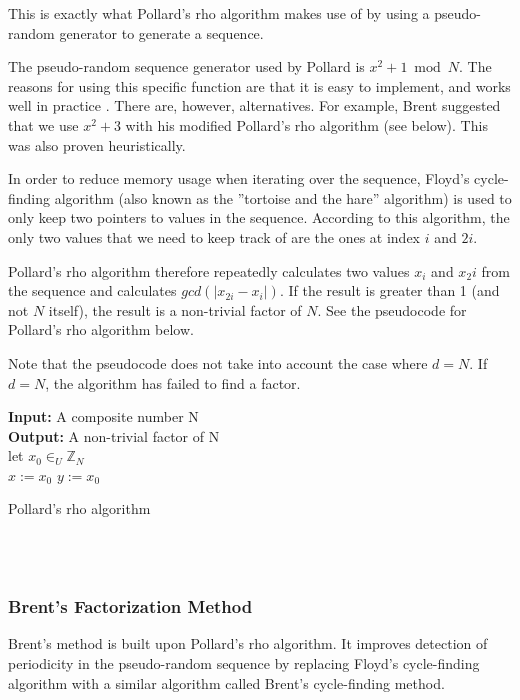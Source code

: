 \documentclass[paper=a4, fontsize=11pt,numbers=endperiod]{scrartcl} %
\providecommand{\abs}[1]{\lvert#1\rvert} %
\numberwithin{equation}{section} %
\numberwithin{figure}{section} %
\numberwithin{table}{section} %
\begin{document}
This is exactly what Pollard's rho algorithm makes use of by using a pseudo-random generator to generate a sequence.

The pseudo-random sequence generator used by Pollard is $x^2 + 1 \bmod N$.
The reasons for using this specific function are that it is easy to implement, and works well in practice \cite{algnotes}.
There are, however, alternatives.
For example, Brent suggested that we use $x^2 +3$ with his modified Pollard's rho algorithm (see below).
This was also proven heuristically. \cite{brent}

In order to reduce memory usage when iterating over the sequence, Floyd's cycle-finding algorithm (also known as the ''tortoise and the hare'' algorithm) is used to only keep two pointers to values in the sequence.
According to this algorithm, the only two values that we need to keep track of are the ones at index $i$ and $2i$. \cite{floyd}

Pollard's rho algorithm therefore repeatedly calculates two values $x_i$ and $x_2i$ from the sequence and calculates $gcd(\abs{x_{2i}-x_i})$.
If the result is greater than 1 (and not $N$ itself), the result is a non-trivial factor of $N$.
See the pseudocode for Pollard's rho algorithm below.

Note that the pseudocode does not take into account the case where $d = N$.
If $d = N$, the algorithm has failed to find a factor.

\begin{algorithm}[H]
 \SetAlgoLined %
 \textbf{Input:} {A composite number N}\\
 \textbf{Output:} {A non-trivial factor of N}\\
 let $x_0 \in_U \mathbb{Z}_N$\\
 $x := x_0$\;
 $y := x_0$\;
 \While{True}{
  $x := f(x)$\;
  $y := f(f(y))$\;
  $d := gcd( \abs{y-x}, N)$\;
  \If{$d > 1$}{
   return d\;
   }
 }
 \caption{Pollard's rho algorithm \cite{algnotes}}
\end{algorithm}
\hspace{0pt}\\\\


\subsubsection{Brent's Factorization Method}
Brent's method is built upon Pollard's rho algorithm.
It improves detection of periodicity in the pseudo-random sequence by replacing Floyd's cycle-finding algorithm with a similar algorithm called Brent's cycle-finding method. \cite{brent}
\end{document}
